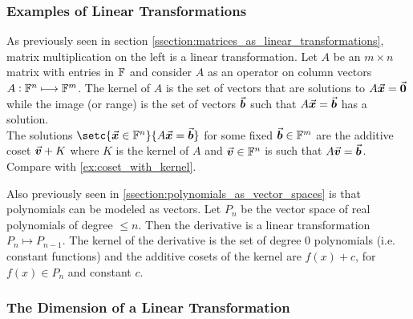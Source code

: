 \documentclass[MathsNotesBase.tex]{subfiles}
\begin{document}
{		\bigskip
		\subsubsection{Examples of Linear Transformations}
		\begin{exe}
			\item{As previously seen in section \ref{ssection:matrices_as_linear_transformations}, matrix multiplication on the left is a linear transformation. Let $A$ be an ${ m \times n }$ matrix with entries in $\mathbb{F}^{}$ and consider $A$ as an operator on column vectors ${ A: \mathbb{F}^{n} \longmapsto \mathbb{F}^{m} }$. The kernel of $A$ is the set of vectors that are solutions to ${ A\vec{\bm{x}} = \vec{\bm{0}} }$ while the image (or range) is the set of vectors $\vec{\bm{b}}$ such that ${ A\vec{\bm{x}} = \vec{\bm{b}} }$ has a solution.\\
				The solutions ${ \setc{\V{x} \in \F{n}}{A\V{x} = \V{b}} }$ for some fixed ${ \vec{\bm{b}} \in \mathbb{F}^{m} }$ are the additive coset ${ \vec{\bm{v}} + K }$ where $K$ is the kernel of $A$ and ${ \vec{\bm{v}} \in \mathbb{F}^{n} }$ is such that ${ A\vec{\bm{v}} = \vec{\bm{b}} }$. Compare with \ref{ex:coset_with_kernel}.
			}
			\item{Also previously seen in \ref{ssection:polynomials_as_vector_spaces} is that polynomials can be modeled as vectors. Let $P_n$ be the vector space of real polynomials of degree ${ \leq n }$. Then the derivative is a linear transformation ${ P_n \longmapsto P_{n-1} }$. The kernel of the derivative is the set of degree 0 polynomials (i.e. constant functions) and the additive cosets of the kernel are ${ f(x) + c }$, for ${ f(x) \in P_n }$ and constant $c$.
			}
		\end{exe}
		
		
		\bigskip\bigskip
		\subsubsection{The Dimension of a Linear Transformation}
		
		\medskip{}
		
}
\end{document}
